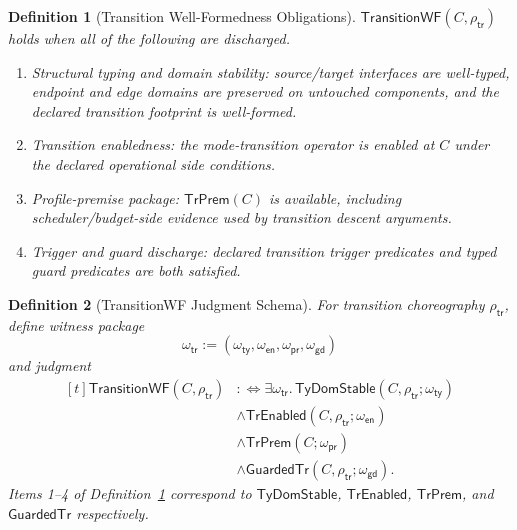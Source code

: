 \documentclass[a4paper,10pt,twocolumn,english]{article}
\numberwithin{equation}{section}
\theoremstyle{paperdef}
\newtheorem{definition}{Definition}[section]
\theoremstyle{paperplain}
\theoremstyle{paperdef}
\theoremstyle{paperremark}
\theoremstyle{paperdef}
\begin{document}
\begin{definition}[Transition Well-Formedness Obligations]
	\label{def:p3-transition-wf}
	$\mathsf{TransitionWF}(C,\rho_{\mathsf{tr}})$ holds when all of the following
	are discharged.
	\begin{enumerate}
		\item Structural typing and domain stability: source/target interfaces are
		      well-typed, endpoint and edge domains are preserved on untouched
		      components, and the declared transition footprint is well-formed.
		\item Transition enabledness: the mode-transition operator is enabled at $C$
		      under the declared operational side conditions.
		\item Profile-premise package: $\mathsf{TrPrem}(C)$ is available, including
		      scheduler/budget-side evidence used by transition descent arguments.
		\item Trigger and guard discharge: declared transition trigger predicates
		      and typed guard predicates are both satisfied.
	\end{enumerate}
\end{definition}

\begin{definition}[TransitionWF Judgment Schema]
	\label{def:p3-transition-wf-schema}
	For transition choreography $\rho_{\mathsf{tr}}$, define witness package
	\[
		\omega_{\mathsf{tr}} := (\omega_{\mathsf{ty}},\omega_{\mathsf{en}},\omega_{\mathsf{pr}},\omega_{\mathsf{gd}})
	\]
	and judgment
	\begin{equation}
		\label{eq:p3-transitionwf-schema}
		\begin{aligned}[t]
			\mathsf{TransitionWF}(C,\rho_{\mathsf{tr}})
			 & :\iff \exists \omega_{\mathsf{tr}}.\,
			\mathsf{TyDomStable}(C,\rho_{\mathsf{tr}};\omega_{\mathsf{ty}})
			\\
			 & \land \mathsf{TrEnabled}(C,\rho_{\mathsf{tr}};\omega_{\mathsf{en}})
			\\
			 & \land \mathsf{TrPrem}(C;\omega_{\mathsf{pr}})
			\\
			 & \land \mathsf{GuardedTr}(C,\rho_{\mathsf{tr}};\omega_{\mathsf{gd}}).
		\end{aligned}
	\end{equation}
	Items 1--4 of Definition~\ref{def:p3-transition-wf} correspond to
	$\mathsf{TyDomStable}$, $\mathsf{TrEnabled}$, $\mathsf{TrPrem}$, and
	$\mathsf{GuardedTr}$ respectively.
\end{definition}
\end{document}
